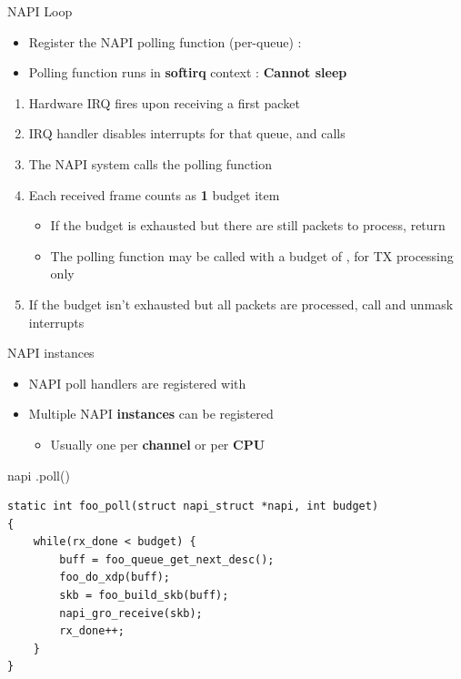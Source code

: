 \begin{frame}{NAPI Loop}
	\begin{itemize}
		\item Register the NAPI polling function (per-queue) : 
		\item Polling function runs in \textbf{softirq} context : \textbf{Cannot sleep}
	\end{itemize}
	\begin{enumerate}
		\item Hardware IRQ fires upon receiving a first packet
		\item IRQ handler disables interrupts for that queue, and calls 
		\item The NAPI system calls the polling function 
		\item Each received frame counts as \textbf{1} budget item
			\begin{itemize}
				\item If the budget is exhausted but there are still packets to process, return 
				\item The polling function may be called with a budget of , for TX processing only
			\end{itemize}
		\item If the budget isn't exhausted but all packets are processed, call  and unmask interrupts
	\end{enumerate}
\end{frame}

\begin{frame}[fragile]{NAPI instances}
	\begin{itemize}
		\item NAPI poll handlers are registered with 
		\item Multiple NAPI \textbf{instances} can be registered
			\begin{itemize}
				\item Usually one per \textbf{channel} or per \textbf{CPU}
			\end{itemize}
	\end{itemize}
	\begin{block}{napi .poll()}
		\begin{verbatim}
static int foo_poll(struct napi_struct *napi, int budget)
{
    while(rx_done < budget) {
        buff = foo_queue_get_next_desc();
        foo_do_xdp(buff);
        skb = foo_build_skb(buff);
        napi_gro_receive(skb);
        rx_done++;
    }
}
		\end{verbatim}
	\end{block}
\end{frame}

